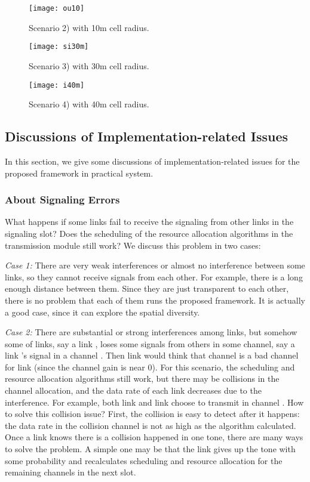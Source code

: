 \documentclass[conference]{IEEEtran}
\begin{document}
\begin{figure}[htb]
\centering
\texttt{[image: ou10]}
\caption{Scenario 2) with 10m cell radius.}
\label{fig:simulation_10}
\end{figure}

\begin{figure}[htb]
\centering
\texttt{[image: si30m]}
\caption{Scenario 3) with 30m cell radius.}
\label{fig:simulation_30}
\end{figure}


\begin{figure}[htb]
\centering
\texttt{[image: i40m]}
\caption{Scenario 4) with 40m cell radius.}
\label{fig:simulation_40}
\end{figure}



\subsection{Discussions of Implementation-related Issues}
In this section, we give some discussions of implementation-related issues for the proposed framework in practical system.
\subsubsection{About Signaling Errors}
What happens if some links fail to receive the signaling from other links in the signaling slot? Does the scheduling of the resource allocation algorithms in the transmission module still work?
We discuss this problem in two cases:

\emph{Case 1:} There are  very weak interferences or almost no interference between some links, so they cannot receive signals from each other. For example, there is a long enough distance between them. Since they are just transparent to each other, there is no problem that each of them runs the proposed framework. It is actually a good case, since it can explore the spatial diversity.

\emph{Case 2:} There are substantial or strong interferences among links, but somehow some of links, say a link , loses some signals from others in some channel, say a link 's signal in a channel . Then link  would think that channel  is a bad channel for link  (since the channel gain is near 0). For this scenario, the scheduling and resource allocation algorithms still work, but there may be collisions in the channel allocation, and the data rate of each link decreases due to the interference. For example, both link  and link  choose to transmit in channel . How to solve this collision issue? First, the collision is easy to detect after it happens: the data rate in the collision channel is not as high as the algorithm calculated. Once a link knows there is a collision happened in one tone, there are many ways to solve the problem. A simple one may be that the link gives up the tone with some probability and recalculates scheduling and resource allocation for the remaining channels in the next slot.
\end{document}
